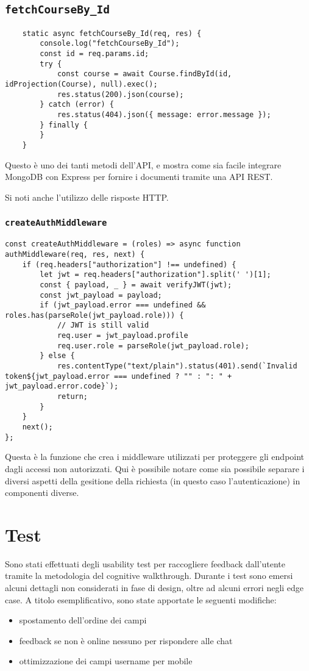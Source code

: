 \documentclass{report}
\begin{document}
\subsection{\texttt{fetchCourseBy_Id}}
\begin{verbatim}
    static async fetchCourseBy_Id(req, res) {
        console.log("fetchCourseBy_Id");
        const id = req.params.id;
        try {
            const course = await Course.findById(id, idProjection(Course), null).exec();
            res.status(200).json(course);
        } catch (error) {
            res.status(404).json({ message: error.message });
        } finally {
        }
    }
\end{verbatim}
\par Questo è uno dei tanti metodi dell'API, e mostra come sia facile integrare MongoDB con Express per fornire i documenti tramite una API REST.
\par Si noti anche l'utilizzo delle risposte HTTP.
\subsubsection{\texttt{createAuthMiddleware}}
\begin{verbatim}
const createAuthMiddleware = (roles) => async function authMiddleware(req, res, next) {
    if (req.headers["authorization"] !== undefined) {
        let jwt = req.headers["authorization"].split(' ')[1];
        const { payload, _ } = await verifyJWT(jwt);
        const jwt_payload = payload;
        if (jwt_payload.error === undefined && roles.has(parseRole(jwt_payload.role))) {
            // JWT is still valid
            req.user = jwt_payload.profile
            req.user.role = parseRole(jwt_payload.role);
        } else {
            res.contentType("text/plain").status(401).send(`Invalid token${jwt_payload.error === undefined ? "" : ": " + jwt_payload.error.code}`);
            return;
        }
    }
    next();
};
\end{verbatim}
\par Questa è la funzione che crea i middleware utilizzati per proteggere gli endpoint dagli accessi non autorizzati. Qui è possibile notare come sia possibile separare i diversi aspetti della gesitione della richiesta (in questo caso l'autenticazione) in componenti diverse.
\section{Test}
\par Sono stati effettuati degli usability test per raccogliere feedback dall'utente tramite la metodologia del cognitive walkthrough. Durante i test sono emersi alcuni dettagli non considerati in fase di design, oltre ad alcuni errori negli edge case. A titolo esemplificativo, sono state apportate le seguenti modifiche:
\begin{itemize}
    \item spostamento dell'ordine dei campi
    \item feedback se non è online nessuno per rispondere alle chat
    \item ottimizzazione dei campi username per mobile
\end{itemize}
\end{document}
